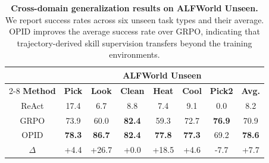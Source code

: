 \begin{table}[ht!]
\centering
\caption{\textbf{Cross-domain generalization results on ALFWorld Unseen.} We report success rates across six unseen task types and their average. OPID improves the average success rate over GRPO, indicating that trajectory-derived skill supervision transfers beyond the training environments.}
\vspace{0.05in}
\label{tab:ood_generalization_alfworld}
\small
\setlength{\tabcolsep}{9pt}
\renewcommand{\arraystretch}{1.08}
\begin{tabular}{cccccccc}
\toprule[1.2pt]
& \multicolumn{7}{c}{\textbf{ALFWorld Unseen}} \\
\cmidrule(lr){2-8}
\textbf{Method} & \textbf{Pick} & \textbf{Look} & \textbf{Clean} & \textbf{Heat} & \textbf{Cool} & \textbf{Pick2} & \textbf{Avg.} \\
\midrule
ReAct        & 17.4 & 6.7  & 8.8  & 7.4  & 9.1  & 0.0  & 8.2  \\
GRPO         & 73.9 & 60.0 & \textbf{82.4} & 59.3 & 72.7 & \textbf{76.9} & 70.9 \\
\rowcolor{gray!10}
OPID         & \textbf{78.3} & \textbf{86.7} & \textbf{82.4} & \textbf{77.8} & \textbf{77.3} & 69.2 & \textbf{78.6} \\
\rowcolor{blue!6}
$\Delta$     & +4.4 & +26.7 & +0.0 & +18.5 & +4.6 & -7.7 & +7.7 \\
\bottomrule[1.2pt]
\end{tabular}
\end{table}